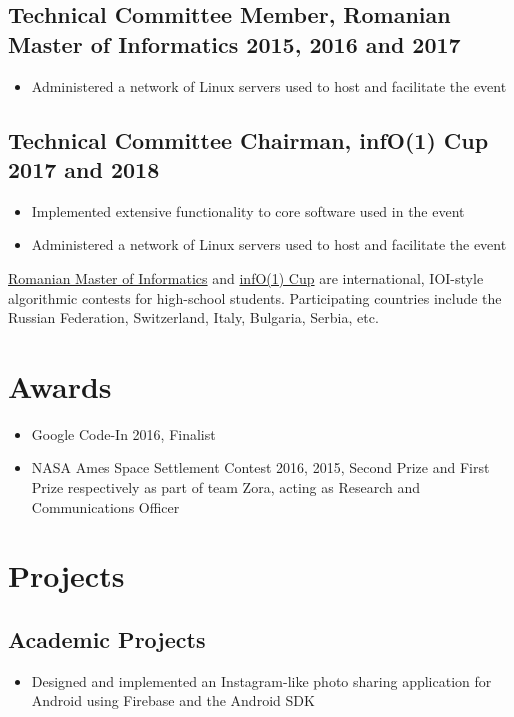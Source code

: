 \documentclass[a4paper]{article}
\begin{document}
\subsection*{Technical Committee Member, Romanian Master of Informatics \hfill
2015, 2016 and 2017}
\begin{itemize}
	\item Administered a network of Linux servers used to host and facilitate
		the event
\end{itemize}

\subsection*{Technical Committee Chairman, infO(1) Cup \hfill 2017 and 2018}
\begin{itemize}
	\item Implemented extensive functionality to core software used in the event
	\item Administered a network of Linux servers used to host and facilitate
		the event
\end{itemize}

\vspace{5pt}
\href{http://rmi.lbi.ro}{Romanian Master of Informatics} and \href{http://info1cup.com/}{infO(1) Cup} are international, IOI-style
algorithmic contests for high-school students. Participating countries include
the Russian Federation, Switzerland, Italy, Bulgaria, Serbia, etc.

\section*{Awards}

\begin{itemize}
	\item Google Code-In 2016, Finalist
	\item NASA Ames Space Settlement Contest 2016, 2015, Second Prize and First
		Prize respectively as part of team Zora, acting as Research and
		Communications Officer
\end{itemize}

\section*{Projects}

\subsection*{Academic Projects}
\begin{itemize}
	\item Designed and implemented an Instagram-like photo sharing application
		for Android using Firebase and the Android SDK
\end{itemize}
\end{document}

